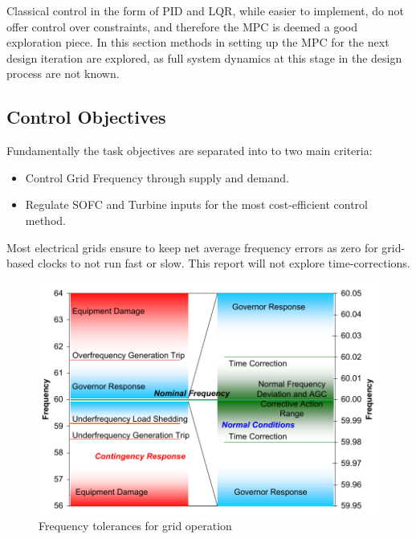 Classical control in the form of PID and LQR, while easier to implement, do not offer control over constraints, and therefore the MPC is deemed a good exploration piece.
In this section methods in setting up the MPC for the next design iteration are explored, as full system dynamics at this stage in the design process are not known.


\subsection{Control Objectives}

Fundamentally the task objectives are separated into to two main criteria:
\begin{itemize}
\item{Control Grid Frequency through supply and demand.}
\item{Regulate SOFC and Turbine inputs for the most cost-efficient control method.}
\end{itemize}
Most electrical grids ensure to keep net average frequency errors as zero for grid-based clocks to not run fast or slow. This report will not explore time-corrections.

\begin{figure}[htb]
\centering
        \includegraphics[scale=0.7]{images/freq.pdf}
\caption{Frequency tolerances for grid operation \cite{power:freqs}}
\label{fig:freqgrid}
\end{figure}
